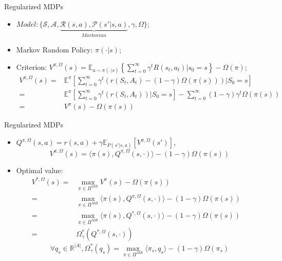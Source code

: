 \documentclass{beamer}
\begin{document}
\begin{frame}[t]{Regularized MDPs}
    \begin{itemize}
        \item $ Model: \{\mathcal{S}, \mathcal{A}, \underbrace{\mathcal{R}(s, a), \mathcal{P}(s'|s, a)}_{Markovian}, \gamma, \Omega\} $;
        \item Markov Random Policy: $ \pi(\cdot | s) $;
        \item Criterion: $ V^{\pi, \Omega}(s) = \mathbb{E}_{a \sim \pi(\cdot | s)} \left\{ \sum^{\infty}_{t=0} \gamma^t R(s_t,a_t) | s_0 = s \right\} - \Omega(\pi) $;
            \begin{align*}
                V^{\pi, \Omega}(s) =& \mathbb{E}^{\pi}\left[ \sum^{\infty}_{t=0} \gamma^t (r(S_t, A_t) - (1-\gamma)\Omega(\pi(s))) \vert S_0 = s \right] \\
               =& \mathbb{E}^{\pi}\left[ \sum^{\infty}_{t=0} \gamma^t (r(S_t, A_t)) \vert S_0 = s \right] - \sum^{\infty}_{t=0} (1-\gamma) \gamma^t \Omega(\pi(s)) \\ 
              =& V^{\pi}(s) - \Omega(\pi(s))
            \end{align*}
    \end{itemize}
\end{frame}

\begin{frame}[t]{Regularized MDPs}
    \begin{itemize}
        \item $ Q^{\pi, \Omega}(s,a) = r(s,a) + \gamma \mathbb{E}_{P(s'|s,a)}\left[ V^{\pi, \Omega}(s') \right] $,
            \[
                V^{\pi, \Omega}(s) = \langle \pi(s), Q^{\pi, \Omega}(s, \cdot) \rangle - (1-\gamma)\Omega(\pi(s)) 
            \]
        \item Optimal value:
            \begin{align*}
                V^{*, \Omega}(s) =& \max_{\pi \in \Pi^{MR}} V^{\pi}(s) - \Omega(\pi(s))\\
                =& \max_{\pi \in \Pi^{MR}} \langle \pi(s), Q^{\pi, \Omega}(s, \cdot) \rangle- (1 - \gamma)\Omega(\pi(s))\\
                =& \max_{\pi \in \Pi^{MR}} \langle \pi(s), Q^{*, \Omega}(s, \cdot) \rangle- (1 - \gamma)\Omega(\pi(s)) \quad \\ 
                =& \Omega^{*}_{\gamma}(Q^{*,\Omega}(s,\cdot))
            \end{align*}
            \[
                \forall q_s \in \mathbb{R}^{\left| A \right|}, \Omega_{\gamma}^{*}(q_s)
                = \max_{\pi \in \Pi^{MR}} \langle \pi_s, q_s \rangle - (1- \gamma) \Omega(\pi_s)
            \]
    \end{itemize}
\end{frame}
\end{document}

